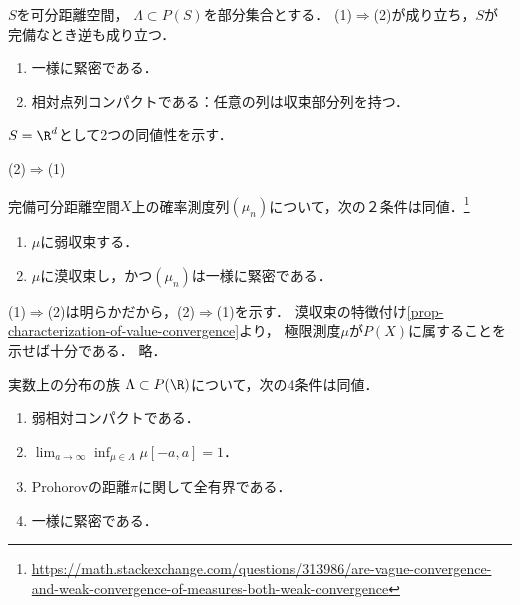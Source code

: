 \documentclass[uplatex,dvipdfmx]{jsreport}
\begin{document}
\begin{proposition}
    $S$を可分距離空間，
    $\Lambda\subset P(S)$を部分集合とする．
    (1)$\Rightarrow$(2)が成り立ち，$S$が完備なとき逆も成り立つ．
    \begin{enumerate}
        \item 一様に緊密である．
        \item 相対点列コンパクトである：任意の列は収束部分列を持つ．
    \end{enumerate}
\end{proposition}
\begin{Proof}
    $S=\R^d$として2つの同値性を示す．
    \begin{description}
        \item[(2)$\Rightarrow$(1)] 
    \end{description}
\end{Proof}

\begin{corollary}[漠収束の特徴付け]
    完備可分距離空間$X$上の確率測度列$(\mu_n)$について，次の２条件は同値．\footnote{\url{https://math.stackexchange.com/questions/313986/are-vague-convergence-and-weak-convergence-of-measures-both-weak-convergence}}
    \begin{enumerate}
        \item $\mu$に弱収束する．
        \item $\mu$に漠収束し，かつ$(\mu_n)$は一様に緊密である．
    \end{enumerate}
\end{corollary}
\begin{Proof}
    (1)$\Rightarrow$(2)は明らかだから，(2)$\Rightarrow$(1)を示す．
    漠収束の特徴付け\ref{prop-characterization-of-value-convergence}より，
    極限測度$\mu$が$P(X)$に属することを示せば十分である．
    略．
\end{Proof}

\begin{corollary}
    実数上の分布の族
    $\Lambda\subset P(\R)$について，次の4条件は同値．
    \begin{enumerate}
        \item 弱相対コンパクトである．
        \item $\lim_{a\to\infty}\inf_{\mu\in\Lambda}\mu[-a,a]=1$．
        \item Prohorovの距離$\pi$に関して全有界である．
        \item 一様に緊密である．
    \end{enumerate}
\end{corollary}
\end{document}
